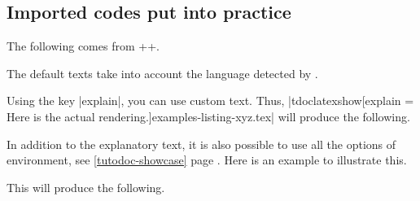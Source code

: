 \documentclass[10pt, a4paper]{tutodoc}
\begin{document}


\subsection{Imported codes put into practice}
\label{tutodoc-latexshow}

\begin{tdocexa}[Showcase]
    The following comes from \tdocinlatex++.

    \medskip

    \begin{tdocshowcaseDOC}
    \end{tdocshowcaseDOC}
\end{tdocexa}


\begin{tdocnote}
    The default texts take into account the language detected by \thisproj.
\end{tdocnote}




\begin{tdocexa}
    Using the key \tdocinlatex|explain|, you can use custom text. Thus, \tdocinlatex|tdoclatexshow[explain = Here is the actual rendering.]{examples-listing-xyz.tex}| will produce the following.

    \medskip

    \begin{tdocshowcaseDOC}
    \end{tdocshowcaseDOC}
\end{tdocexa}




\begin{tdocexa}
    In addition to the explanatory text, it is also possible to use all the options of  environment, see \ref{tutodoc-showcase} page \pageref{tutodoc-showcase}.
    Here is an example to illustrate this.

    \medskip


    \medskip

    This will produce the following.

    \medskip

    \begin{tdocshowcaseDOC}
        
    \end{tdocshowcaseDOC}
\end{tdocexa}
\end{document}
